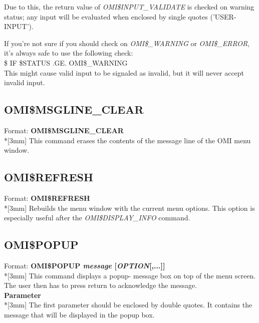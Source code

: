\documentclass[a4paper]{book}
\newcommand{\vs}{\vspace{3mm}}
\renewcommand{\indent}{\hspace*{5mm}}
\begin{document}
Due to this, the return value of \textsl{OMI{\$}INPUT{\_}VALIDATE} is checked on warning status; any input 
will be evaluated when enclosed by single quotes ('USER-INPUT').

\vs

If you're not sure if you should check on \textsl{OMI{\$}{\_}WARNING} or 
\textsl{OMI{\$}{\_}ERROR}, it's always safe to use the following check: \\
\indent\textsf{{\$} IF {\$}STATUS .GE. OMI{\$}{\_}WARNING} \\
This might cause valid input to be signaled as invalid, but it will never 
accept invalid input.

\subsection{OMI{\$}MSGLINE{\_}CLEAR}
\label{subsubsec:mylabel57}

\indent Format: \textbf{OMI{\$}MSGLINE{\_}CLEAR}\\*[3mm]
This command erases the contents of the message line of the OMI menu window.

\subsection{OMI{\$}REFRESH}
\label{subsubsec:mylabel58}

\indent Format: \textbf{OMI{\$}REFRESH}\\*[3mm]
Rebuilds the menu window with the current menu options. This option is 
especially useful after the \textsl{OMI{\$}DISPLAY{\_}INFO} command.

\subsection{OMI{\$}POPUP}
\label{subsubsec:mylabel59}


\indent Format: \textbf{OMI{\$}POPUP \textit{message} [\textit{OPTION}[,...]]}\\*[3mm]
This command displays a popup- message box on top of the menu screen. The 
user then has to press return to acknowledge the message.\\[3mm]
\textbf{Parameter}\\*[3mm]
The first parameter should be enclosed by double quotes. It contains the 
message that will be displayed in the popup box.\\[3mm]
\end{document}
